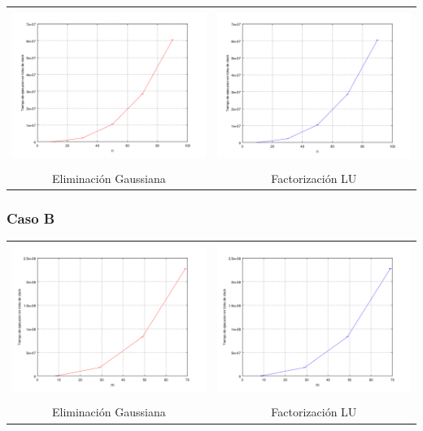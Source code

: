         {\centering \begin{tabular}{cc}
           \includegraphics[height=5cm]{graficos/exp1/exp1-angulos0.png} & \includegraphics[height=5cm]{graficos/exp1/exp1-angulos1.png} \\
          {\small Eliminación Gaussiana} &
          {\small Factorización LU} \\
         \end{tabular}}


    \subsubsection*{Caso B}
        
        {\centering \begin{tabular}{cc}
           \includegraphics[height=5cm]{graficos/exp1/exp1-radios0.png} & \includegraphics[height=5cm]{graficos/exp1/exp1-radios1.png} \\
          {\small Eliminación Gaussiana} &
          {\small Factorización LU} \\
         \end{tabular}}


